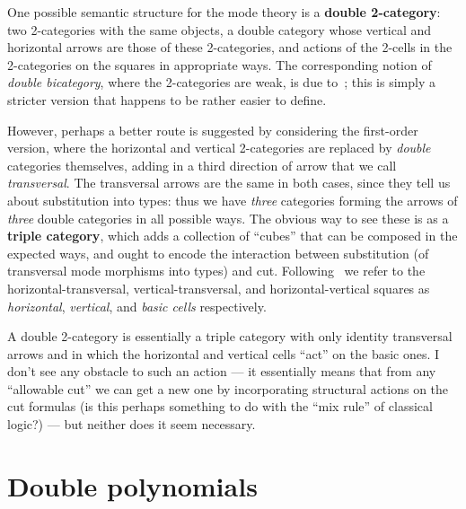 \documentclass{article}
\theoremstyle{definition}
\begin{document}
One possible semantic structure for the mode theory is a \textbf{double 2-category}: two 2-categories with the same objects, a double category whose vertical and horizontal arrows are those of these 2-categories, and actions of the 2-cells in the 2-categories on the squares in appropriate ways.
The corresponding notion of \emph{double bicategory}, where the 2-categories are weak, is due to~\cite{verity:base-change}; this is simply a stricter version that happens to be rather easier to define.

However, perhaps a better route is suggested by considering the first-order version, where the horizontal and vertical 2-categories are replaced by \emph{double} categories themselves, adding in a third direction of arrow that we call \emph{transversal}.
The transversal arrows are the same in both cases, since they tell us about substitution into types: thus we have \emph{three} categories forming the arrows of \emph{three} double categories in all possible ways.
The obvious way to see these is as a \textbf{triple category}, which adds a collection of ``cubes'' that can be composed in the expected ways, and ought to encode the interaction between substitution (of transversal mode morphisms into types) and cut.
Following~\cite{gp:intercategories-i,gp:intercategories-ii} we refer to the horizontal-transversal, vertical-transversal, and horizontal-vertical squares as \emph{horizontal}, \emph{vertical}, and \emph{basic cells} respectively.

A double 2-category is essentially a triple category with only identity transversal arrows and in which the horizontal and vertical cells ``act'' on the basic ones.
I don't see any obstacle to such an action --- it essentially means that from any ``allowable cut'' we can get a new one by incorporating structural actions on the cut formulas (is this perhaps something to do with the ``mix rule'' of classical logic?) --- but neither does it seem necessary.


\section{Double polynomials}
\label{sec:double-polynomials}
\end{document}

